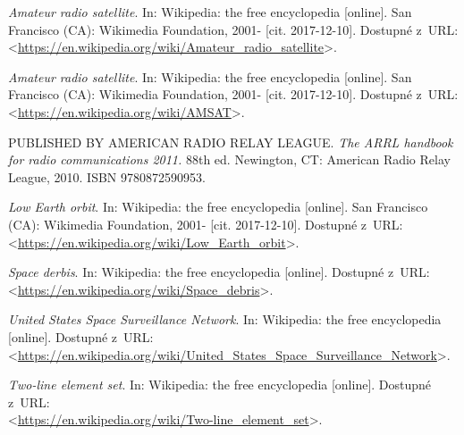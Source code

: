 

\begin{literatura}{99}

    \emph{Amateur radio satellite}. In: Wikipedia: the free encyclopedia\/ [online].
    San Francisco (CA): Wikimedia Foundation, 2001- [cit. 2017-12-10].
    Dostupné z~URL:\\
    <\url{https://en.wikipedia.org/wiki/Amateur_radio_satellite}>.

    \emph{Amateur radio satellite}. In: Wikipedia: the free encyclopedia\/ [online].
    San Francisco (CA): Wikimedia Foundation, 2001- [cit. 2017-12-10].
    Dostupné z~URL:\\
    <\url{https://en.wikipedia.org/wiki/AMSAT}>.

    PUBLISHED BY AMERICAN RADIO RELAY LEAGUE.
    \emph{The ARRL handbook for radio communications 2011.} 88th ed. Newington, CT: American Radio Relay League, 2010. ISBN 9780872590953.

    \emph{Low Earth orbit}. In: Wikipedia: the free encyclopedia\/ [online].
    San Francisco (CA): Wikimedia Foundation, 2001- [cit. 2017-12-10].
    Dostupné z~URL:\\
    <\url{https://en.wikipedia.org/wiki/Low_Earth_orbit}>.

    \emph{Space derbis}. In: Wikipedia: the free encyclopedia\/ [online].
    Dostupné z~URL:\\
    <\url{https://en.wikipedia.org/wiki/Space_debris}>.

    \emph{United States Space Surveillance Network}. In: Wikipedia: the free encyclopedia\/ [online].
    Dostupné z~URL:\\
    <\url{https://en.wikipedia.org/wiki/United_States_Space_Surveillance_Network}>.

    \emph{Two-line element set}. In: Wikipedia: the free encyclopedia\/ [online].
    Dostupné z~URL:\\
    <\url{https://en.wikipedia.org/wiki/Two-line_element_set}>.




\end{literatura}
